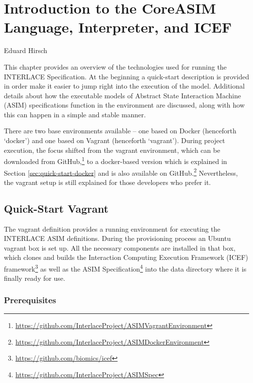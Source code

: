 \chapter{Introduction to the CoreASIM Language, Interpreter, and ICEF}
\label{ch:CoreAsimIntro}

\vspace{-1cm}
\begin{center}
Eduard Hirsch
\end{center}

This chapter provides an overview of the technologies used for running the INTERLACE Specification. At the beginning a quick-start description is provided in order make it easier to jump right into the execution of the model. Additional details about how the executable models of Abstract State Interaction Machine (ASIM) specifications function in the environment are discussed, along with how this can happen in a simple and stable manner.

There are two base environments available -- one based on Docker (henceforth `docker') and one based on Vagrant (henceforth `vagrant'). During project execution, the focus shifted from the vagrant environment, which can be downloaded from GitHub,\footnote{\url{https://github.com/InterlaceProject/ASIMVagrantEnvironment}} to a docker-based version which is explained in Section \ref{sec:quick-start-docker} and is also available on GitHub.\footnote{\url{https://github.com/InterlaceProject/ASIMDockerEnvironment}} Nevertheless, the vagrant setup is still explained for those developers who prefer it.

\section{Quick-Start Vagrant}
\label{sec:quick-start-vagrant}

The vagrant definition provides a running environment for executing the INTERLACE ASIM definitions. During the provisioning process an Ubuntu vagrant box is set up. All the necessary components are installed in that box, which clones and builds the Interaction Computing Execution Framework (ICEF) framework\footnote{\url{https://github.com/biomics/icef}} as well as the ASIM Specification\footnote{\url{https://github.com/InterlaceProject/ASIMSpec}} into the data directory where it is finally ready for use.

\subsection{Prerequisites}

